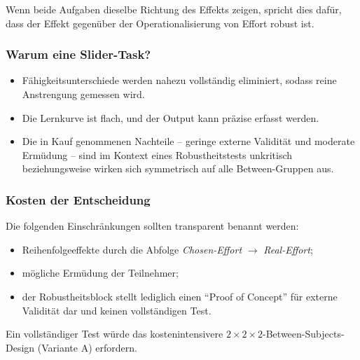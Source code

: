 \documentclass[
    11pt,
    a4paper,
    parskip=half,
    headings=normal
]{scrartcl}
\numberwithin{equation}{section}
\theoremstyle{definition}
\theoremstyle{remark}
\begin{document}
Wenn beide Aufgaben dieselbe Richtung des Effekts zeigen, spricht dies dafür, dass der Effekt gegenüber der Operationalisierung von Effort robust ist.

\subsubsection{Warum eine Slider-Task?}

\begin{itemize}

    \item Fähigkeitsunterschiede werden nahezu vollständig eliminiert, sodass reine Anstrengung gemessen wird.

    \item Die Lernkurve ist flach, und der Output kann präzise erfasst werden.

    \item Die in Kauf genommenen Nachteile -- geringe externe Validität und moderate Ermüdung -- sind im Kontext eines Robustheitstests unkritisch beziehungsweise wirken sich symmetrisch auf alle Between-Gruppen aus.

\end{itemize}

\subsubsection{Kosten der Entscheidung}

Die folgenden Einschränkungen sollten transparent benannt werden:

\begin{itemize}

    \item Reihenfolgeeffekte durch die Abfolge \textit{Chosen-Effort} $\rightarrow$ \textit{Real-Effort};

    \item mögliche Ermüdung der Teilnehmer;

    \item der Robustheitsblock stellt lediglich einen ``Proof of Concept'' für externe Validität dar und keinen vollständigen Test.

\end{itemize}

Ein vollständiger Test würde das kostenintensivere $2 \times 2 \times 2$-Between-Subjects-Design (Variante A) erfordern.
\end{document}
